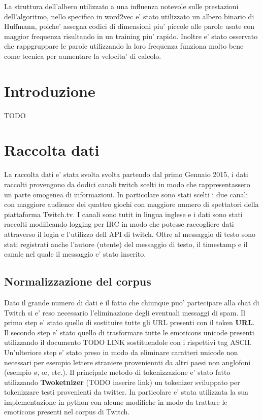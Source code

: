 \documentclass[a4paper,11pt]{book}
\theoremstyle{definition}
\begin{document}
La struttura dell'albero utilizzato a una influenza notevole sulle prestazioni dell'algoritmo, nello specifico
in word2vec e' stato utilizzato un albero binario di Huffmann, poiche' assegna codici di dimensioni piu' piccole
alle parole usate con maggior frequenza risultando in un training piu' rapido.
Inoltre e' stato osservato che rappgruppare le parole utilizzando la loro frequenza funziona molto
bene come tecnica per aumentare la velocita' di calcolo.

\chapter{Introduzione}
TODO

\chapter{Raccolta dati}
La raccolta dati e' stata svolta svolta partendo dal primo Gennaio 2015, i dati raccolti provengono da dodici canali twitch scelti in modo che rappresentassero un parte omogenea di informazioni.
In particolare sono stati scelti i due canali con maggiore audience dei quattro giochi con maggiore numero di spettatori della piattaforma Twitch.tv.
I canali sono tutit in lingua inglese e i dati sono stati raccolti modificando logging per IRC  in modo che potesse raccogliere dati attraverso il login e l'utilizzo dell API di twitch.
Oltre al messaggio di testo sono stati registrati anche l'autore (utente) del messaggio di testo, il timestamp e il canale nel quale il messaggio e' stato inserito.

\section{Normalizzazione del corpus}
Dato il grande numero di dati e il fatto che chiunque puo' partecipare alla chat di Twitch si e' reso necessario l'eliminazione degli eventuali messaggi di spam. Il primo step e' stato quello di sostituire tutte gli URL presenti con il token \textbf{URL}. 
Il secondo step e' stato quello di trasformare tutte le emoticons unicode presenti utilizzando il documento TODO LINK sostituendole con i rispettivi tag ASCII. Un'ulteriore step e' stato preso in modo da eliminare caratteri unicode non necessari per esempio lettere straniere proveniennti da altri paesi non anglofoni (esempio \o, \oe, etc.).
Il principale metodo di tokenizzazione e' stato fatto utilizzando \textbf{Twoketnizer} (TODO inserire link) un tokenizer sviluppato per tokenizzare testi provenienti da twitter. In particolare e' stata utilizzata la sua implementazione in python con alcune modifiche in modo da trattare le emoticons presenti nel corpus di Twitch.
\end{document}
